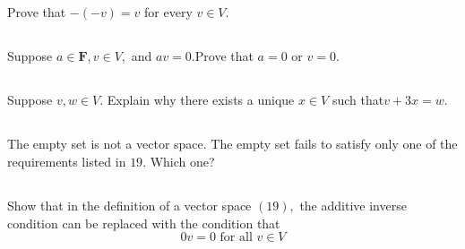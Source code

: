 \documentclass[a4paper]{article}
\begin{document}
\subsection{}
Prove that $-(-v)=v$ for every $v \in V$.
\paragraph{}

\subsection{}
Suppose $a \in \mathbf{F}, v \in V,$ and $a v=0$.Prove that $a=0$ or $v=0$.
\paragraph{}

\subsection{}
Suppose $v, w \in V .$ Explain why there exists a unique $x \in V$ such that$v+3 x=w$.
\paragraph{}

\subsection{}
The empty set is not a vector space. The empty set fails to satisfy only one of the requirements listed in $19 .$ Which one?
\paragraph{}

\subsection{}
Show that in the definition of a vector space $(19),$ the additive inverse condition can be replaced with the condition that
\[
    0 v=0 \text { for all } v \in V
\]
\paragraph{}
\end{document}
